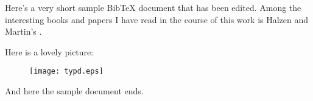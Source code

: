 \documentclass[12pt]{report}
\begin{document}
Here's a very short sample BibTeX document that has been edited. Among the interesting books and
papers I have read in the course of this work is Halzen and Martin's \cite{Ellis:1996cg}.

Here is a lovely picture:

\begin{figure}[htb]
\centering
\texttt{[image: typd.eps]}
\label{fig:awesome_image}
\end{figure}

And here the sample document ends.



\end{document}
